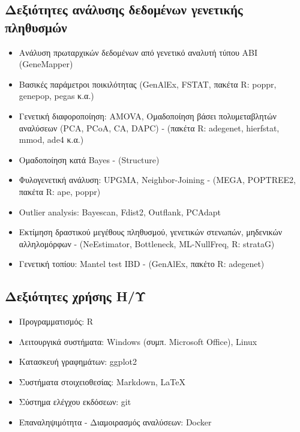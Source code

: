 \documentclass[12pt,]{scrartcl}
\begin{document}
\subsection{Δεξιότητες ανάλυσης δεδομένων γενετικής πληθυσμών}\label{genetics}
\begin{itemize}
\vspace{-3mm}
\setlength\itemsep{-0.6em}
\item Ανάλυση πρωταρχικών δεδομένων από γενετικό αναλυτή τύπου ΑΒΙ (GeneMapper)
\item Βασικές παράμετροι ποικιλότητας (GenAlEx, FSTAT, πακέτα R: poppr, genepop, pegas κ.α.)
\item Γενετική διαφοροποίηση: AMOVA, Ομαδοποίηση βάσει πολυμεταβλητών αναλύσεων (PCA, PCoA, CA, DAPC) - (πακέτα R: adegenet, hierfstat, mmod, ade4 κ.α.)
\item Ομαδοποίηση κατά Bayes - (Structure)
\item Φυλογενετική ανάλυση: UPGMA, Neighbor-Joining - (MEGA, POPTREE2, πακέτα R: ape, poppr)
\item Outlier analysis: Bayescan, Fdist2, Outflank, PCAdapt
\item Εκτίμηση δραστικού μεγέθους πληθυσμού, γενετικών στενωπών, μηδενικών αλληλομόρφων - (NeEstimator, Bottleneck, ML-NullFreq, R: strataG)
\item Γενετική τοπίου: Mantel test IBD - (GenAlEx, πακέτο R: adegenet)

\end{itemize}

\subsection{Δεξιότητες χρήσης Η/Υ}\label{it}
\begin{itemize}
\vspace{-3mm}
\setlength\itemsep{-0.6em}
\item Προγραμματισμός: R
\item Λειτουργικά συστήματα: Windows (συμπ. Microsoft Office), Linux
\item Κατασκευή γραφημάτων: ggplot2 %
\item Συστήματα στοιχειοθεσίας: Markdown, \LaTeX
\item Σύστημα ελέγχου εκδόσεων: git
\item Επαναληψιμότητα - Διαμοιρασμός αναλύσεων: Docker %
\end{itemize}
\end{document}
